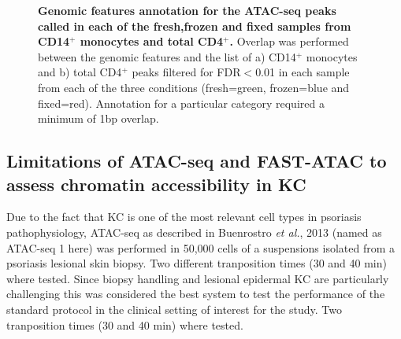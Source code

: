 \begin{figure}[htbp]
\begin{subfigure}{0.5\textwidth}
\caption{\textbf{}}
\end{subfigure}
\caption[Genomic features annotation for the ATAC-seq peaks called in each of the fresh,frozen and fixed samples from CD14$^+$ monocytes and total CD4$^+$.]{\textbf{Genomic features annotation for the ATAC-seq peaks called in each of the fresh,frozen and fixed samples from CD14$^+$ monocytes and total CD4$^+$.} Overlap was performed between the genomic features and the list of a) CD14$^+$ monocytes and b) total CD4$^+$ peaks filtered for FDR$<$0.01 in each sample from each of the three conditions (fresh=green, frozen=blue and fixed=red). Annotation for a particular category required a minimum of 1bp overlap.}
\label{fig:Core_ATAC_all_conditions_genomic_features}
\end{figure} 








\subsection{Limitations of ATAC-seq and FAST-ATAC to assess chromatin accessibility in KC}

Due to the fact that KC is one of the most relevant cell types in psoriasis pathophysiology, ATAC-seq as described in Buenrostro \textit{et al.}, 2013 (named as ATAC-seq 1 here) was performed in 50,000 cells of a suspensions isolated from a psoriasis lesional skin biopsy. Two different tranposition times (30 and 40 min) where tested. Since biopsy handling and lesional epidermal KC are particularly challenging this was considered the best system to test the performance of the standard protocol in the clinical setting of interest for the study. Two tranposition times (30 and 40 min) where tested.


